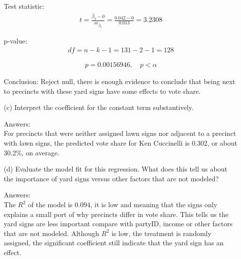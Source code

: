 \documentclass[12pt,letterpaper]{article}
\begin{document}
\begin{enumerate}
	Test statistic:
	\begin{align*}
		t = \frac{\hat{\beta}_2 - 0}{se_{\hat{\beta}_2}} = \frac{0.042 - 0}{0.013} = 3.2308
	\end{align*}
	
	p-value:
	\begin{align}
		df = n-k-1 = 131-2-1 = 128
	\end{align}
	
	\begin{align}
		p = 0.00156946, \quad p < \alpha
	\end{align}
	
	Conclusion: Reject null, there is enough evidence to conclude that being next to precincts with these yard signs have some effects to vote share.
	
	\newpage
	\item [(c)] Interpret the coefficient for the constant term substantively.\\
	\begin{doublespace}
		Answers: \\
		For precincts that were neither assigned lawn signs nor adjacent to a precinct with lawn signs, the predicted vote share for Ken Cuccinelli is 0.302, or about 30.2\%, on average.
	\end{doublespace}
	
	\item [(d)] Evaluate the model fit for this regression.  What does this	tell us about the importance of yard signs versus other factors that are not modeled? \\
	\begin{doublespace}
		Answers: \\
		The $R^2$ of the model is 0.094, it is low and meaning that the signs only explains a small port of why precincts differ in vote share. This tells us the yard signs are less important compare with partyID, income or other factors that are not modeled. Although $R^2$ is low, the treatment is randomly assigned, the significant coefficient still indicate that the yard sign has an effect.
	\end{doublespace}
	
\end{enumerate}  
\end{document}
